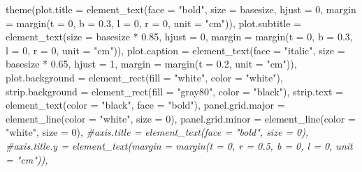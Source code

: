 \documentclass[
]{book}
\newenvironment{Shaded}{\begin{snugshade}}{\end{snugshade}}
\newcommand{\AttributeTok}[1]{\textcolor[rgb]{0.77,0.63,0.00}{#1}}
\newcommand{\CommentTok}[1]{\textcolor[rgb]{0.56,0.35,0.01}{\textit{#1}}}
\newcommand{\DecValTok}[1]{\textcolor[rgb]{0.00,0.00,0.81}{#1}}
\newcommand{\FloatTok}[1]{\textcolor[rgb]{0.00,0.00,0.81}{#1}}
\newcommand{\FunctionTok}[1]{\textcolor[rgb]{0.00,0.00,0.00}{#1}}
\newcommand{\NormalTok}[1]{#1}
\newcommand{\SpecialCharTok}[1]{\textcolor[rgb]{0.00,0.00,0.00}{#1}}
\newcommand{\StringTok}[1]{\textcolor[rgb]{0.31,0.60,0.02}{#1}}
\theoremstyle{definition}
\theoremstyle{definition}
\theoremstyle{definition}
\theoremstyle{definition}
\theoremstyle{remark}
\begin{document}
\begin{Shaded}
\begin{Highlighting}[]
    \FunctionTok{theme}\NormalTok{(}\AttributeTok{plot.title =} \FunctionTok{element\_text}\NormalTok{(}\AttributeTok{face =} \StringTok{"bold"}\NormalTok{, }\AttributeTok{size =}\NormalTok{ basesize, }\AttributeTok{hjust =} \DecValTok{0}\NormalTok{, }\AttributeTok{margin =} \FunctionTok{margin}\NormalTok{(}\AttributeTok{t =} \DecValTok{0}\NormalTok{, }\AttributeTok{b =} \FloatTok{0.3}\NormalTok{, }\AttributeTok{l =} \DecValTok{0}\NormalTok{, }\AttributeTok{r =} \DecValTok{0}\NormalTok{, }\AttributeTok{unit =} \StringTok{"cm"}\NormalTok{)),}
          \AttributeTok{plot.subtitle =} \FunctionTok{element\_text}\NormalTok{(}\AttributeTok{size =}\NormalTok{ basesize }\SpecialCharTok{*} \FloatTok{0.85}\NormalTok{, }\AttributeTok{hjust =} \DecValTok{0}\NormalTok{, }\AttributeTok{margin =} \FunctionTok{margin}\NormalTok{(}\AttributeTok{t =} \DecValTok{0}\NormalTok{, }\AttributeTok{b =} \FloatTok{0.3}\NormalTok{, }\AttributeTok{l =} \DecValTok{0}\NormalTok{, }\AttributeTok{r =} \DecValTok{0}\NormalTok{, }\AttributeTok{unit =} \StringTok{"cm"}\NormalTok{)),}
          \AttributeTok{plot.caption =} \FunctionTok{element\_text}\NormalTok{(}\AttributeTok{face =} \StringTok{"italic"}\NormalTok{, }\AttributeTok{size =}\NormalTok{ basesize }\SpecialCharTok{*} \FloatTok{0.65}\NormalTok{, }\AttributeTok{hjust =} \DecValTok{1}\NormalTok{, }\AttributeTok{margin =} \FunctionTok{margin}\NormalTok{(}\AttributeTok{t =} \FloatTok{0.2}\NormalTok{, }\AttributeTok{unit =} \StringTok{"cm"}\NormalTok{)),}
          \AttributeTok{plot.background =} \FunctionTok{element\_rect}\NormalTok{(}\AttributeTok{fill =} \StringTok{"white"}\NormalTok{, }\AttributeTok{color =} \StringTok{"white"}\NormalTok{),}
          \AttributeTok{strip.background =} \FunctionTok{element\_rect}\NormalTok{(}\AttributeTok{fill =} \StringTok{"gray80"}\NormalTok{, }\AttributeTok{color =} \StringTok{"black"}\NormalTok{),}
          \AttributeTok{strip.text =} \FunctionTok{element\_text}\NormalTok{(}\AttributeTok{color =} \StringTok{"black"}\NormalTok{, }\AttributeTok{face =} \StringTok{"bold"}\NormalTok{),}
          \AttributeTok{panel.grid.major =} \FunctionTok{element\_line}\NormalTok{(}\AttributeTok{color =} \StringTok{"white"}\NormalTok{, }\AttributeTok{size =} \DecValTok{0}\NormalTok{),}
          \AttributeTok{panel.grid.minor =} \FunctionTok{element\_line}\NormalTok{(}\AttributeTok{color =} \StringTok{"white"}\NormalTok{, }\AttributeTok{size =} \DecValTok{0}\NormalTok{),}
          \CommentTok{\#axis.title = element\_text(face = "bold", size = 0),}
          \CommentTok{\#axis.title.y = element\_text(margin = margin(t = 0, r = 0.5, b = 0, l = 0, unit = "cm")),}

\end{Highlighting}
\end{Shaded}
\end{document}
